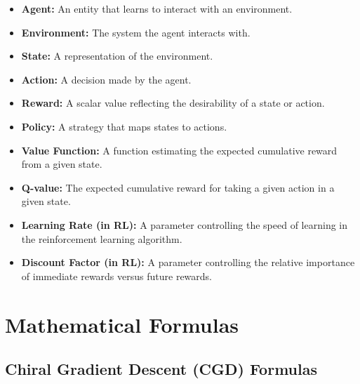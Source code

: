 \documentclass[12pt, a4paper]{article}
\begin{document}
\begin{itemize}
    \item \textbf{Agent:} An entity that learns to interact with an environment.
    \item \textbf{Environment:} The system the agent interacts with.
    \item \textbf{State:} A representation of the environment.
    \item \textbf{Action:} A decision made by the agent.
    \item \textbf{Reward:} A scalar value reflecting the desirability of a state or action.
    \item \textbf{Policy:} A strategy that maps states to actions.
    \item \textbf{Value Function:} A function estimating the expected cumulative reward from a given state.
    \item \textbf{Q-value:} The expected cumulative reward for taking a given action in a given state.
    \item \textbf{Learning Rate (in RL): } A parameter controlling the speed of learning in the reinforcement learning algorithm.
    \item \textbf{Discount Factor (in RL): }  A parameter controlling the relative importance of immediate rewards versus future rewards.
\end{itemize}


\section{Mathematical Formulas}

\subsection{Chiral Gradient Descent (CGD) Formulas}
\end{document}
